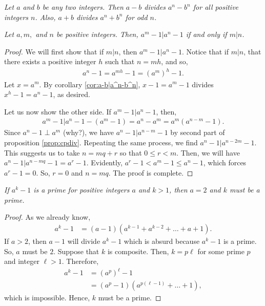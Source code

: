 \documentclass{subfile}
\begin{document}
	\begin{corollary}\slshape
		\label{cor:a-b|a^n-b^n}
		Let $a$ and $b$ be any two integers. Then $a-b$ divides $a^n-b^n$ for all positive integers $n$. Also, $a+b$ divides $a^n+b^n$ for odd $n$.
	\end{corollary}


	\begin{theorem}\slshape\label{thm:powerdiv}
		Let $a,m,$ and $n$ be positive integers. Then, $a^m-1|a^n-1$ if and only if $m|n$.
	\end{theorem}

	\begin{proof}
		We will first show that if $m|n$, then $a^m-1|a^n-1$. Notice that if $m|n$, that there exists a positive integer $h$ such that $n=mh$, and so,
		\begin{align*}
			a^n-1 = a^{mh}-1 = \left( a^m\right)^h -1.
		\end{align*}
		Let $x=a^m$. By corollary \eqref{cor:a-b|a^n-b^n}, $x-1=a^m-1$ divides $x^h-1=a^n-1$, as desired.

		Let us now show the other side. If $a^m-1|a^n-1$, then,
		\begin{align*}
			a^m-1|a^n-1-(a^m-1)=a^n-a^m=a^m(a^{n-m}-1).
		\end{align*}
		Since $a^n-1\perp a^m$ (why?), we have $a^n-1|a^{n-m}-1$ by second part of proposition \eqref{prop:cpdiv}. Repeating the same process, we find $a^n-1|a^{n-2m}-1$. This suggests us to take $n=mq+r$ so that $0\leq r<m$. Then, we will have $a^n-1|a^{n-mq}-1=a^r-1$. Evidently, $a^r-1<a^m-1\leq a^n-1$, which forces $a^r-1=0$. So, $r=0$ and $n=mq$. The proof is complete.
	\end{proof}

	\begin{theorem}\slshape
		\label{thm:a^k-1prime}
		If $a^k-1$ is a prime for positive integers $a$ and $k>1$, then $a=2$ and $k$ must be a prime.
	\end{theorem}

	\begin{proof}
		As we already know,
		\begin{align*}
			a^k-1 & = (a-1)(a^{k-1}+a^{k-2}+\dots+a+1).
		\end{align*}
		If $a>2$, then $a-1$ will divide $a^k-1$ which is absurd because $a^k-1$ is a prime. So, $a$ must be $2$. Suppose that $k$ is composite. Then, $k=p\ell$ for some prime $p$ and integer $\ell>1$. Therefore,
		\begin{align*}
			a^k-1&=\left(a^p\right)^\ell -1\\
			&= (a^p-1)\left(a^{p(\ell-1)}+\dots+1\right),
		\end{align*}
		which is impossible. Hence, $k$ must be a prime.
	\end{proof}
\end{document}
